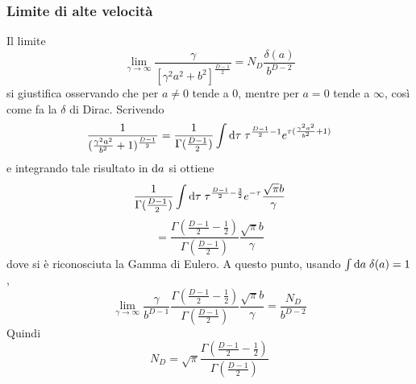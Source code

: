 \subsubsection{Limite di alte velocit\`a}
Il limite
\[ \lim_{\gamma\rightarrow\infty} \frac{\gamma}{[\gamma^2a^2+b^2]^{\frac{D-1}{2}}} = N_D \frac{\delta(a)}{b^{D-2}} \]
si giustifica osservando che per \( a\neq0\) tende a 0, mentre per \( a=0\) tende a $\infty$, cos\`i come fa la $\delta$ di Dirac.
Scrivendo
\[ \frac{1}{(\frac{\gamma^2a^2}{b^2} +1)^{\frac{D-1}{2}}} = \frac{1}{\Gamma({\frac{D-1}{2}})} 
		\int \mathrm{d} \tau \;\tau^{\frac{D-1}{2}-1}e^{\tau(\frac{\gamma^2a^2}{b^2}+1)} \]
e integrando tale risultato in $\mathrm{d} a$ si ottiene
\[ \frac{1}{\Gamma({\frac{D-1}{2}})} 
		\int \mathrm{d} \tau \;\tau^{\frac{D-1}{2}-\frac{3}{2}} e^{-\tau} \frac{\sqrt{\pi}b}{\gamma} \]
\[ = \frac{\Gamma({\frac{D-1}{2}}-\frac{1}{2})}{\Gamma({\frac{D-1}{2}})} \frac{\sqrt{\pi}b}{\gamma} \]
dove si \`e riconosciuta la Gamma di Eulero.
A questo punto, usando \( \int \mathrm{d} a \; \delta(a) = 1 \),
\[ \lim_{\gamma\rightarrow\infty} \frac{\gamma}{b^{D-1}} \frac{\Gamma({\frac{D-1}{2}}-\frac{1}{2})}{\Gamma({\frac{D-1}{2}})} \frac{\sqrt{\pi}b}{\gamma} = \frac{N_D}{b^{D-2}} \]
Quindi
\[ N_D = \sqrt{\pi} \frac{\Gamma({\frac{D-1}{2}}-\frac{1}{2})}{\Gamma({\frac{D-1}{2}})} \]



































